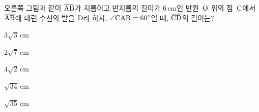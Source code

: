 \noindent\begin{minipage}[t]{0.58\linewidth}\vspace{0pt}\raggedright 오른쪽 그림과 같이 $\overline{\mathrm{AB}}$가 지름이고 반지름의 길이가 $6\,\mathrm{cm}$인 반원~$\mathrm{O}$ 위의 점~$\mathrm{C}$에서 $\overline{\mathrm{AB}}$에 내린 수선의 발을 $\mathrm{D}$라 하자. $\angle\mathrm{CAB}=60^\circ$일 때, $\overline{\mathrm{CD}}$의 길이는?\end{minipage}\hfill\begin{minipage}[t]{0.4\linewidth}\vspace{0pt}\centering \resizebox{\ifdim\width>\linewidth\linewidth\else\width\fi}{!}{}\end{minipage}\par
\begin{choices32}{\rule[-3ex]{0pt}{8ex}$3\sqrt{3}\,\mathrm{cm}$}{\rule[-3ex]{0pt}{8ex}$2\sqrt{7}\,\mathrm{cm}$}{\rule[-3ex]{0pt}{8ex}$4\sqrt{2}\,\mathrm{cm}$}{\rule[-3ex]{0pt}{8ex}$\sqrt{34}\,\mathrm{cm}$}{\rule[-3ex]{0pt}{8ex}$\sqrt{35}\,\mathrm{cm}$}\end{choices32}
